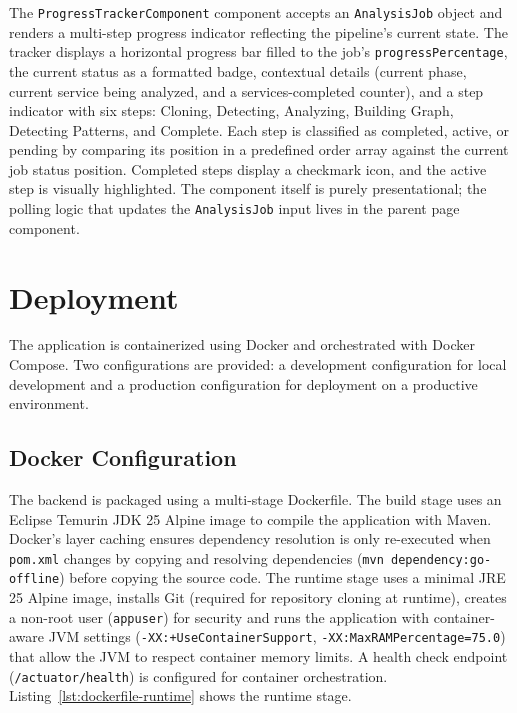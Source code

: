 \par The \texttt{ProgressTrackerComponent} component accepts an \texttt{AnalysisJob} object and renders a multi-step progress indicator reflecting the pipeline's current state. The tracker displays a horizontal progress bar filled to the job's \texttt{progress\-Per\-cen\-tage}, the current status as a formatted badge, contextual details (current phase, current service being analyzed, and a services-completed counter), and a step indicator with six steps: Cloning, Detecting, Analyzing, Building Graph, Detecting Patterns, and Complete. Each step is classified as completed, active, or pending by comparing its position in a predefined order array against the current job status position. Completed steps display a checkmark icon, and the active step is visually highlighted. The component itself is purely presentational; the polling logic that updates the \texttt{AnalysisJob} input lives in the parent page component.

\section{Deployment}
\label{sec:deployment}

 \par The application is containerized using Docker and orchestrated with Docker Compose. Two configurations are provided: a development configuration for local development and a production configuration for deployment on a productive environment.

\subsection{Docker Configuration}
\label{subsec:docker-config}

 \par The backend is packaged using a multi-stage Dockerfile. The build stage uses an Eclipse Temurin JDK 25 Alpine image to compile the application with Maven. Docker's layer caching ensures dependency resolution is only re-executed when \texttt{pom.xml} changes by copying and resolving dependencies (\texttt{mvn dependency:go-offline}) before copying the source code. The runtime stage uses a minimal JRE 25 Alpine image, installs Git (required for repository cloning at runtime), creates a non-root user (\texttt{appuser}) for security and runs the application with container-aware JVM settings (\texttt{-XX:+UseContainerSupport}, \texttt{-XX:MaxRAMPercentage=75.0}) that allow the JVM to respect container memory limits. A health check endpoint (\texttt{/actuator/health}) is configured for container orchestration. Listing~\ref{lst:dockerfile-runtime} shows the runtime stage.

